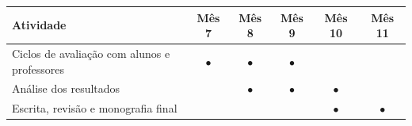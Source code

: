 \begin{quadro}[htbp]

    \centering
    \caption{\label{qua:cronograma-2-2}Cronograma de Desenvolvimento}

    \begin{tabular}{|p{7.5cm}|c|c|c|c|c|}

    \hline

    \textbf{Atividade} & \textbf{Mês 7} & \textbf{Mês 8} & \textbf{Mês 9} & \textbf{Mês 10} & \textbf{Mês 11} \\ \hline

    Ciclos de avaliação com alunos e professores & $\bullet$ & $\bullet$ & $\bullet$ & & \\ \hline

    Análise dos resultados & & $\bullet$ & $\bullet$ & $\bullet$ & \\ \hline

    Escrita, revisão e monografia final & & & & $\bullet$ & $\bullet$ \\ \hline

    \end{tabular}


\end{quadro}
